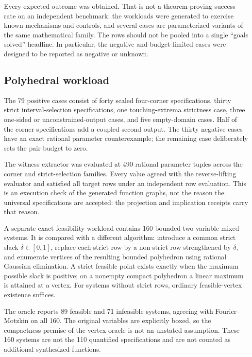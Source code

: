 Every expected outcome was obtained. That is not a theorem-proving success rate on an independent benchmark: the workloads were generated to exercise known mechanisms and controls, and several cases are parameterized variants of the same mathematical family. The rows should not be pooled into a single ``goals solved'' headline. In particular, the negative and budget-limited cases were designed to be reported as negative or unknown.

\subsection{Polyhedral workload}
The 79 positive cases consist of forty scaled four-corner specifications, thirty strict interval-selection specifications, one touching-extrema strictness case, three one-sided or unconstrained-output cases, and five empty-domain cases. Half of the corner specifications add a coupled second output. The thirty negative cases have an exact rational parameter counterexample; the remaining case deliberately sets the pair budget to zero.

The witness extractor was evaluated at 490 rational parameter tuples across the corner and strict-selection families. Every value agreed with the reverse-lifting evaluator and satisfied all target rows under an independent row evaluation. This is an execution check of the generated function graphs, not the reason the universal specifications are accepted: the projection and implication receipts carry that reason.

A separate exact feasibility workload contains 160 bounded two-variable mixed systems. It is compared with a different algorithm: introduce a common strict slack \(\delta\in[0,1]\), replace each strict row by a non-strict row strengthened by \(\delta\), and enumerate vertices of the resulting bounded polyhedron using rational Gaussian elimination. A strict feasible point exists exactly when the maximum possible slack is positive; on a nonempty compact polyhedron a linear maximum is attained at a vertex. For systems without strict rows, ordinary feasible-vertex existence suffices.

The oracle reports 89 feasible and 71 infeasible systems, agreeing with Fourier--Motzkin on all 160. The original variables are explicitly boxed, so the compactness premise of the vertex oracle is not an unstated assumption. These 160 systems are not the 110 quantified specifications and are not counted as additional synthesized functions.

